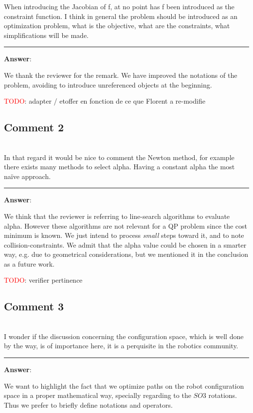 \documentclass{scrartcl}
\newcommand{\todo}{\textcolor{red}{TODO}}
\begin{document}
When introducing the Jacobian of f, at no point has f been introduced as the constraint function. I think in general the problem should be introduced as an optimization problem, what is the objective, what are the constraints, what simplifications will be made.

\rule{\linewidth}{.1pt}
\textbf{Answer}:

We thank the reviewer for the remark. We have improved the notations of the problem, avoiding to introduce unreferenced objects at the beginning.

\todo : adapter / etoffer en fonction de ce que Florent a re-modifie

\subsection{Comment 2}
\hrulefill\\

In that regard it would be nice to comment the Newton method, for example there exists many methods to select alpha. Having a constant alpha the most naïve approach.

\rule{\linewidth}{.1pt}
\textbf{Answer}:

We think that the reviewer is referring to line-search algorithms to 
evaluate alpha. However these algorithms are not relevant for a QP problem since 
the cost minimum is known. We just intend to process \textit{small} steps toward it, and to note collision-constraints. We admit that the alpha value could be chosen in a smarter way, e.g. due to geometrical considerations, but we mentioned it in the conclusion as a future work.

\todo : verifier pertinence

\subsection{Comment 3}
\hrulefill\\

I wonder if the discussion concerning the configuration space, which is well done by the way, is of importance here, it is a perquisite in the robotics community.

\rule{\linewidth}{.1pt}
\textbf{Answer}:

We want to highlight the fact that we optimize paths on the robot 
configuration space in a proper mathematical way, specially regarding to the $SO3$ rotations. Thus we prefer to briefly define notations and operators.
\end{document}
